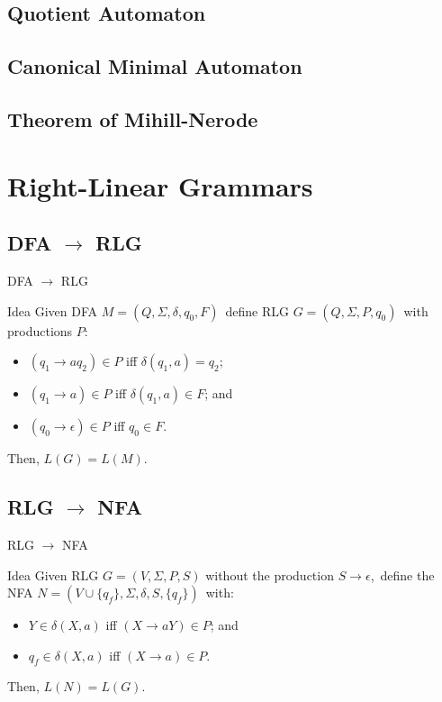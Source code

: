 \documentclass{beamer}
\def\padding{\vspace{0.5cm}}
\begin{document}
\subsection{Quotient Automaton}

\subsection{Canonical Minimal Automaton}

\subsection{Theorem of Mihill-Nerode}

\section{Right-Linear Grammars}

\subsection{DFA $\to$ RLG}

\begin{frame}{DFA $\to$ RLG}
    \begin{block}{Idea}
        Given DFA $M = (Q, \Sigma, \delta, q_0, F)$\pause\ define RLG $G = (Q, \Sigma, P, q_0)$\pause\ with productions $P$:\pause
        \begin{itemize}
            \item $(q_1 \to a q_2) \in P$ iff $\delta(q_1, a) = q_2$\pause;
            \item $(q_1 \to a) \in P$ iff $\delta(q_1, a) \in F$\pause; and
            \item $(q_0 \to \epsilon) \in P$ iff $q_0 \in F$.
        \end{itemize}\pause\padding
        Then, $L(G) = L(M)$.
    \end{block}
\end{frame}

\subsection{RLG $\to$ NFA}

\begin{frame}{RLG $\to$ NFA}
    \begin{block}{Idea}
        Given RLG $G = (V, \Sigma, P, S)$ without the production $S \to \epsilon$\pause,\ define the NFA $N = (V \cup \{q_f\}, \Sigma, \delta, S, \{q_f\})$\pause\ with:
        \begin{itemize}
            \item $Y \in \delta(X, a)$ iff $(X \to aY) \in P$\pause; and
            \item $q_f \in \delta(X, a)$ iff $(X \to a) \in P$.
        \end{itemize}\pause\padding
        Then, $L(N) = L(G)$.
    \end{block}
\end{frame}
\end{document}
